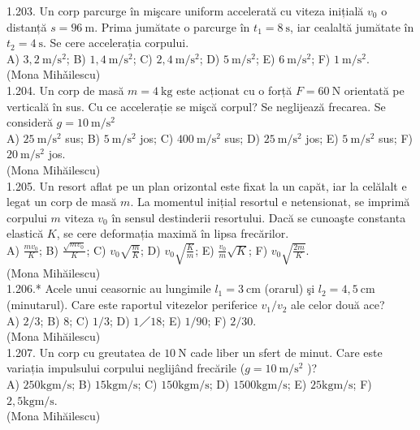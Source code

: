 1.203. Un corp parcurge în mişcare uniform accelerată cu viteza inițială $v_{0}$ o distanță $s=96 \mathrm{~m}$. Prima jumătate o parcurge în $t_{1}=8 \mathrm{~s}$, iar cealaltă jumătate în $t_{2}=4 \mathrm{~s}$. Se cere accelerația corpului.\\ A) $3,2 \mathrm{~m} / \mathrm{s}^{2}$; B) $1,4 \mathrm{~m} / \mathrm{s}^{2}$; C) $2,4 \mathrm{~m} / \mathrm{s}^{2}$; D) $5 \mathrm{~m} / \mathrm{s}^{2}$; E) $6 \mathrm{~m} / \mathrm{s}^{2}$; F) $1 \mathrm{~m} / \mathrm{s}^{2}$.\\ (Mona Mihǎilescu)\\

1.204. Un corp de masă $m=4 \mathrm{~kg}$ este acționat cu o forță $F=60 \mathrm{~N}$ orientată pe verticală în sus. Cu ce accelerație se mişcă corpul? Se neglijează frecarea. Se consideră $g=10 \mathrm{~m} / \mathrm{s}^{2}$\\ A) $25 \mathrm{~m} / \mathrm{s}^{2}$ sus; B) $5 \mathrm{~m} / \mathrm{s}^{2}$ jos; C) $400 \mathrm{~m} / \mathrm{s}^{2}$ sus; D) $25 \mathrm{~m} / \mathrm{s}^{2}$ jos; E) $5 \mathrm{~m} / \mathrm{s}^{2}$ sus; F) $20 \mathrm{~m} / \mathrm{s}^{2}$ jos.\\ (Mona Mihăilescu)\\

1.205. Un resort aflat pe un plan orizontal este fixat la un capăt, iar la celălalt e legat un corp de masă $m$. La momentul inițial resortul e netensionat, se imprimă corpului $m$ viteza $v_{0}$ în sensul destinderii resortului. Dacă se cunoaşte constanta elastică $K$, se cere deformația maximă în lipsa frecărilor.\\ A) $\frac{m v_{0}}{K}$; B) $\frac{\sqrt{m v_{0}}}{K}$; C) $v_{0} \sqrt{\frac{m}{K}}$; D) $v_{0} \sqrt{\frac{K}{m}}$; E) $\frac{v_{0}}{m} \sqrt{K}$; F) $v_{0} \sqrt{\frac{2 m}{K}}$.\\ (Mona Mihăilescu)\\

1.206.* Acele unui ceasornic au lungimile $l_{1}=3 \mathrm{~cm}$ (orarul) şi $l_{2}=4,5 \mathrm{~cm}$ (minutarul). Care este raportul vitezelor periferice $v_{1} / v_{2}$ ale celor două ace?\\ A) $2 / 3$; B) $8$; C) $1 / 3$; D) $1／18$; E) $1 / 90$; F) $2 / 30$.\\ (Mona Mihăilescu)\\

1.207. Un corp cu greutatea de $10 \mathrm{~N}$ cade liber un sfert de minut. Care este variația impulsului corpului neglijând frecările ($g=10 \mathrm{~m} / \mathrm{s}^{2}$ )?\\ A) $250 \mathrm{kgm} / \mathrm{s}$; B) $15 \mathrm{kgm} / \mathrm{s}$; C) $150 \mathrm{kgm} / \mathrm{s}$; D) $1500 \mathrm{kgm} / \mathrm{s}$; E) $25 \mathrm{kgm} / \mathrm{s}$; F) $2,5 \mathrm{kgm} / \mathrm{s}$.\\ (Mona Mihăilescu)\\

